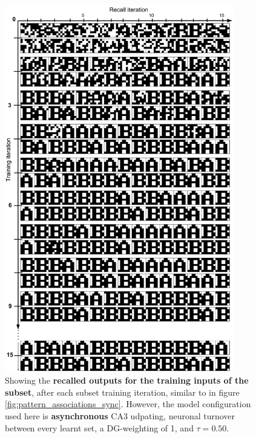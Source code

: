 \begin{figure}
    \centering
    \includegraphics[width=10cm]{fig/AB-pattern-associations-async-tm0-dgw1-tau050}
    \caption{Showing the \textbf{recalled outputs for the training inputs of the subset}, after each subset training iteration, similar to in figure \ref{fig:pattern_associations_sync}. However, the model configuration used here is \textbf{asynchronous} CA3 udpating, neuronal turnover between every learnt set, a DG-weighting of 1, and $\tau=0.50$.}
    \label{fig:pattern_associations_async}
\end{figure}


